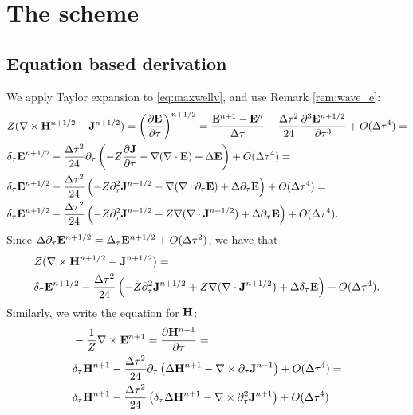 \documentclass[12pt,reqno]{amsart}
\newcommand{\e}{{\bf E}}
\newcommand{\h}{{\bf H}}
\newcommand{\J}{{\bf J}}
\theoremstyle{definition}
\numberwithin{equation}{section}
\begin{document}
   
	\section{The scheme}
	\subsection{Equation based derivation}
	We apply Taylor expansion to \eqref{eq:maxwellv}, and use Remark \ref{rem:wave_e}:
	\begin{align*}
	&
	Z(\nabla \times \h^{n+1/2}-\J^{n+1/2})=	\left (  \frac{\partial \e}{\partial \tau} \right)^{n+1/2}=
		\frac{\e^{n+1} -\e^n}{\Delta \tau}-\frac{\Delta \tau^2}{24}\frac{\partial^3 \e^{n+1/2}}{\partial \tau^3}+O(\Delta \tau^4)=\\&
		\delta_{\tau}\e^{n+1/2}-\frac{\Delta \tau^2}{24}\partial_{\tau}
		\left(
		-Z\frac{\partial \J}{\partial \tau}-\nabla(\nabla \cdot \e)+\Delta \e
		\right)+O(\Delta \tau^4)=\\&
			\delta_{\tau}\e^{n+1/2}-\frac{\Delta \tau^2}{24}
		\left(
		-Z\partial_{\tau}^2\J^{n+1/2}
		-\nabla(\nabla\cdot\partial_\tau \e)+\Delta \partial_{\tau}\e
		\right)+O(\Delta \tau^4)=\\&
			\delta_{\tau}\e^{n+1/2}-\frac{\Delta \tau^2}{24}
		\left(
		-Z\partial_{\tau}^2\J^{n+1/2}
		+Z\nabla(\nabla\cdot\J^{n+1/2})+\Delta \partial_{\tau}\e
		\right)+O(\Delta \tau^4).
	\end{align*}
Since  $\Delta \partial_{\tau}\e^{n+1/2}=\Delta_{\tau} \e^{n+1/2}+O(\Delta \tau^2) $,
we have 
that 
\begin{align*}
	&
		Z(\nabla \times \h^{n+1/2}-\J^{n+1/2})=\\&
	\delta_{\tau}\e^{n+1/2}-\frac{\Delta \tau^2}{24}
\left(
-Z\partial_{\tau}^2\J^{n+1/2}
+Z\nabla(\nabla\cdot\J^{n+1/2})+\Delta \delta_{\tau}\e
\right)+O(\Delta \tau^4).
\end{align*}
Similarly, we write the equation for $\h$:
\begin{align*}
	& 
	-\frac{1}{Z}\nabla \times \e^{n+1}=\frac{\partial \h^{n+1}}{\partial \tau}=\\&
	\delta_\tau \h^{n+1}-\frac{\Delta \tau^2}{24}\partial_{\tau}\left ( 
\Delta \h^{n+1}-\nabla \times \partial_{\tau}\J^{n+1}
	\right)+O(\Delta \tau^4)=\\&
		\delta_\tau \h^{n+1}-\frac{\Delta \tau^2}{24}\left ( 
	\delta_{\tau}\Delta\h^{n+1}-\nabla \times \partial_{\tau}^2\J^{n+1}
	\right)+O(\Delta \tau^4)
\end{align*}
	
\end{document}
